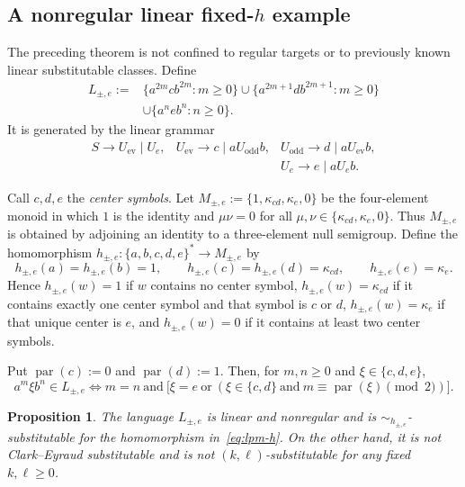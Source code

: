 \documentclass[11pt,a4paper]{article}
\newtheorem{proposition}[theorem]{Proposition}
\theoremstyle{remark}
\theoremstyle{plain}
\begin{document}
\subsection{A nonregular linear \texorpdfstring{fixed-$h$}{fixed-h} example}

The preceding theorem is not confined to regular targets or to previously
known linear substitutable classes.  Define
\[
\begin{split}
L_{\pm,e}:={}&
\{a^{2m}cb^{2m}:m\ge0\}
\cup
\{a^{2m+1}db^{2m+1}:m\ge0\}\\
&\cup
\{a^neb^n:n\ge0\}.
\end{split}
\]
It is generated by the linear grammar
\[
\begin{array}{lll}
S\to U_{\mathrm{ev}}\mid U_e, &
U_{\mathrm{ev}}\to c\mid aU_{\mathrm{odd}}b, &
U_{\mathrm{odd}}\to d\mid aU_{\mathrm{ev}}b,\\[1mm]
&&U_e\to e\mid aU_eb.
\end{array}
\]

Call $c,d,e$ the \emph{center symbols}.  Let
$M_{\pm,e}:=\{1,\kappa_{cd},\kappa_e,0\}$ be the four-element monoid in
which $1$ is the identity and $\mu\nu=0$ for all
$\mu,\nu\in\{\kappa_{cd},\kappa_e,0\}$.  Thus $M_{\pm,e}$ is obtained
by adjoining an identity to a three-element null semigroup.  Define the
homomorphism $h_{\pm,e}:\{a,b,c,d,e\}^*\to M_{\pm,e}$ by
\begin{equation}\label{eq:lpm-h}
 h_{\pm,e}(a)=h_{\pm,e}(b)=1,\qquad
 h_{\pm,e}(c)=h_{\pm,e}(d)=\kappa_{cd},\qquad
 h_{\pm,e}(e)=\kappa_e.
\end{equation}
Hence $h_{\pm,e}(w)=1$ if $w$ contains no center symbol, $h_{\pm,e}(w)=\kappa_{cd}$ if it
contains exactly one center symbol and that symbol is $c$ or $d$,
$h_{\pm,e}(w)=\kappa_e$ if that unique center is $e$, and $h_{\pm,e}(w)=0$ if it contains at
least two center symbols.

Put $\operatorname{par}(c):=0$ and $\operatorname{par}(d):=1$.  Then, for
$m,n\ge0$ and $\xi\in\{c,d,e\}$,
\begin{equation}\label{eq:lpm-membership}
a^m\xi b^n\in L_{\pm,e}
\iff
m=n
\ \text{and}\
\bigl[
 \xi=e
 \ \text{or}\
 (\xi\in\{c,d\}
  \ \text{and}\
  m\equiv\operatorname{par}(\xi)\pmod2)
\bigr].
\end{equation}

\begin{proposition}\label{prop:linear-separator-example}
The language $L_{\pm,e}$ is linear and nonregular and is
$\sim_{h_{\pm,e}}$-substitutable for the homomorphism in~\eqref{eq:lpm-h}.  On the
other hand, it is not Clark--Eyraud substitutable and is not
$(k,\ell)$-substitutable for any fixed $k,\ell\ge0$.
\end{proposition}
\end{document}
